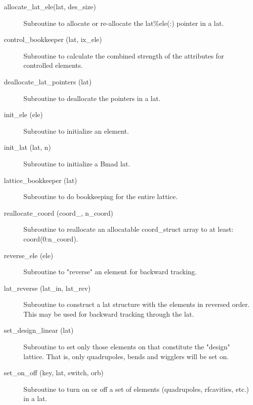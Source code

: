 \begin{description}

\item[allocate_lat_ele(lat, des_size)] \Newline 
Subroutine to allocate or re-allocate the lat\%ele(:) pointer in a lat.

\item[control_bookkeeper (lat, ix_ele)] \Newline
Subroutine to calculate the combined strength of the attributes for
controlled elements.

\item[deallocate_lat_pointers (lat)] \Newline 
Subroutine to deallocate the pointers in a lat.

\item[init_ele (ele)] \Newline
Subroutine to initialize an element. 

\item[init_lat (lat, n)] \Newline 
Subroutine to initialize a Bmad lat.

\item[lattice_bookkeeper (lat)] \Newline 
Subroutine to do bookkeeping for the entire lattice.

\item[reallocate_coord (coord_, n_coord)] \Newline 
Subroutine to reallocate an allocatable  coord_struct array to at least:
coord(0:n_coord).

\item[reverse_ele (ele)] \Newline
Subroutine to "reverse" an element for backward tracking. 

\item[lat_reverse (lat_in, lat_rev)] \Newline
Subroutine to construct a lat structure with the elements in reversed 
order. This may be used for backward tracking through the lat. 

\item[set_design_linear (lat)] \Newline
Subroutine to set only those elements on that constitute the "design" 
lattice. That is, only quadrupoles, bends and wigglers will be set on. 

\item[set_on_off (key, lat, switch, orb)] \Newline
Subroutine to turn on or off a set of elements (quadrupoles,
rfcavities, etc.) in a lat.


\end{description}
